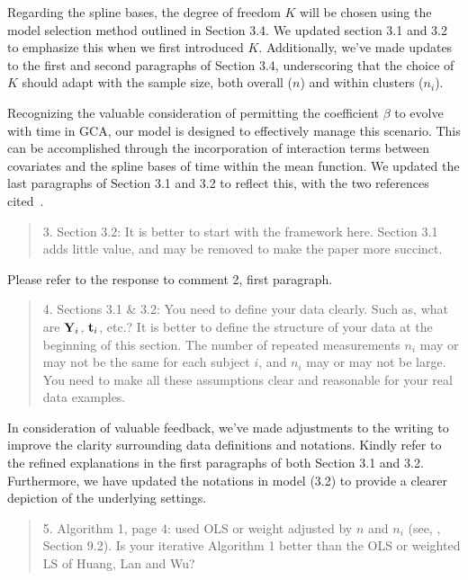 \documentclass[12pt]{article}
\newenvironment{comment}%
{\begin{quotation}\noindent\small\it\ignorespaces%
  }{\end{quotation}}
\begin{document}
Regarding the spline bases, the degree of freedom $K$ will be chosen
using the model selection method outlined in Section 3.4. We updated
section 3.1 and 3.2 to emphasize this when we first introduced
$K$. Additionally, we've made updates to the first and second
paragraphs of Section 3.4, underscoring that the choice of $K$ should
adapt with the sample size, both overall ($n$) and within clusters
($n_i$).


Recognizing the valuable consideration of permitting the coefficient
$\beta$ to evolve with time in GCA, our model
is designed to effectively manage this scenario. This can be accomplished
through the incorporation of interaction terms between covariates and
the spline bases of time within the mean function. We updated the
last paragraphs of Section 3.1 and 3.2 to reflect this,
with the two references cited~\citep{huang2002varying,
  huang2004polynomial}.

\begin{comment}
  3. Section 3.2: It is better to start with the framework
  here. Section 3.1 adds little value, and may be removed to make the
  paper more succinct.
\end{comment}

Please refer to the response to comment 2, first paragraph.


\begin{comment}
  4. Sections 3.1 $\&$ 3.2: You need to define your data clearly. Such
  as, what are ${\bf Y}_i$, ${\bf t}_i$, etc.? It is better to define
  the structure of your data at the beginning of this section. The
  number of repeated measurements $n_i$ may or may not be the same for
  each subject $i$, and $n_i$ may or may not be large. You need to
  make all these assumptions clear and reasonable for your real data
  examples.
\end{comment}

In consideration of valuable feedback, we've made adjustments
to the writing to improve the clarity surrounding data definitions
and notations. Kindly refer to the refined explanations in the first
paragraphs of both Section 3.1 and 3.2. Furthermore, we have updated
the notations in model (3.2) to provide a clearer depiction of the
underlying settings.


\begin{comment}
  5. Algorithm 1, page 4: \cite{huang2002varying, huang2004polynomial}
  used OLS or weight adjusted by $n$ and $n_i$ (see,
  \cite{wu2018nonparametric}, Section 9.2). Is your iterative
  Algorithm 1 better than the OLS or weighted LS of Huang, Lan and Wu?
\end{comment}
\end{document}

